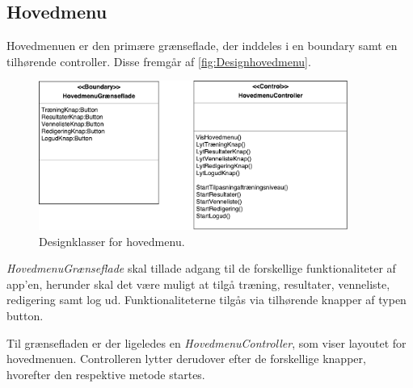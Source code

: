 \subsection{Hovedmenu} \label{sec:MVCHovedmenu}
Hovedmenuen er den primære grænseflade, der inddeles i en boundary samt en tilhørende controller. Disse fremgår af \autoref{fig:Designhovedmenu}.

\begin{figure} [H]
\centering
\includegraphics[width=0.9\textwidth]{figures/MVC/MVCHovedmenu}
\caption{Designklasser for hovedmenu.}
\label{fig:Designhovedmenu}
\end{figure}

\textit{HovedmenuGrænseflade} skal tillade adgang til de forskellige funktionaliteter af app’en, herunder skal det være muligt at tilgå træning, resultater, venneliste, redigering samt log ud. Funktionaliteterne tilgås via tilhørende knapper af typen button. 

Til grænsefladen er der ligeledes en \textit{HovedmenuController}, som viser layoutet for hovedmenuen. Controlleren lytter derudover efter de forskellige knapper, hvorefter den respektive metode startes.  
